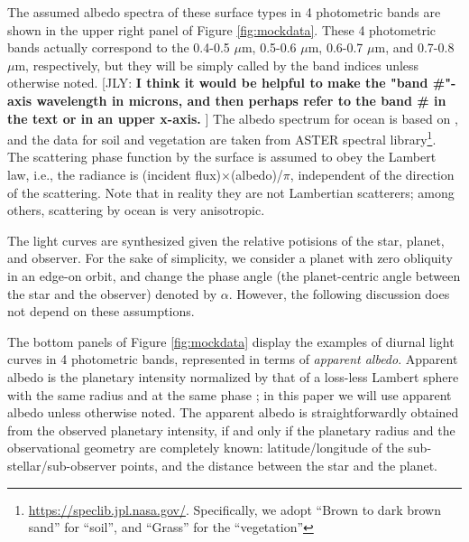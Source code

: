 \documentclass[iop,numberedappendix,apj,]{emulateapj}
\def\memoYF#1{\color{red}[YF: {\bf #1}]\color{black}}
\def\memoJLY#1{\color{green}[JLY: {\bf #1}]\color{black}}
\begin{document}
The assumed albedo spectra of these surface types in 4 photometric bands are shown in the upper right panel of Figure \ref{fig:mockdata}. 
These 4 photometric bands actually correspond to the 0.4-0.5 $\mu $m, 0.5-0.6 $\mu $m, 0.6-0.7 $\mu $m, and 0.7-0.8 $\mu $m, respectively, but they will be simply called by the band indices unless otherwise noted. \memoJLY{I think it would be helpful to make the "band \#"-axis wavelength in microns, and then perhaps refer to the band \# in the text or in an upper x-axis. }
The albedo spectrum for ocean is based on \citet{Mclinden1997}, 
and the data for soil and vegetation are taken from ASTER spectral library\footnote{\url{https://speclib.jpl.nasa.gov/}. 
Specifically, we adopt  ``Brown to dark brown sand'' for ``soil'', and ``Grass'' for the ``vegetation''}. 
The scattering phase function by the surface is assumed to obey the Lambert law, i.e., the radiance is (incident flux)$\times $(albedo)/$\pi$, independent of the direction of the scattering. 
Note that in reality they are not Lambertian scatterers; among others,  scattering by ocean is very anisotropic.  


The light curves are synthesized given the relative potisions of the star, planet, and observer.  
For the sake of simplicity, we consider a planet with zero obliquity in an edge-on orbit, and change the phase angle (the planet-centric angle between the star and the observer) denoted by $\alpha $. 
However, the following discussion does not depend on these assumptions. 

The bottom panels of Figure \ref{fig:mockdata} display the examples of diurnal light curves in 4 photometric bands, represented in terms of {\it apparent albedo}. 
Apparent albedo is the planetary intensity normalized by that of a loss-less Lambert sphere with the same radius and at the same phase \citep{Qiu2003, Seager2010}; in this paper we will use apparent albedo unless otherwise noted. 
The apparent albedo is straightforwardly obtained from the observed planetary intensity, if and only if the planetary radius and the observational geometry are completely known: latitude/longitude of the sub-stellar/sub-observer points, and the distance between the star and the planet. 
\end{document}
